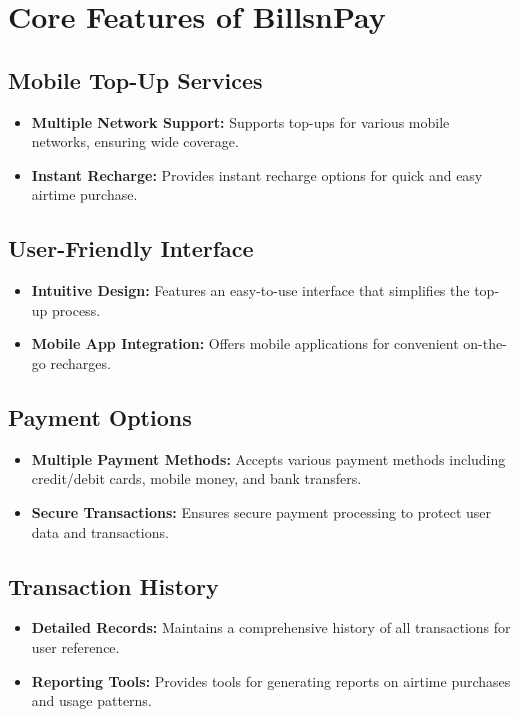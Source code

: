 \documentclass[a4paper,12pt]{report}
\begin{document}
	
	\section{Core Features of BillsnPay}
	
	\subsection{Mobile Top-Up Services}
	\begin{itemize}
		\item \textbf{Multiple Network Support:} Supports top-ups for various mobile networks, ensuring wide coverage.
		\item \textbf{Instant Recharge:} Provides instant recharge options for quick and easy airtime purchase.
	\end{itemize}
	
	\subsection{User-Friendly Interface}
	\begin{itemize}
		\item \textbf{Intuitive Design:} Features an easy-to-use interface that simplifies the top-up process.
		\item \textbf{Mobile App Integration:} Offers mobile applications for convenient on-the-go recharges.
	\end{itemize}
	
	\subsection{Payment Options}
	\begin{itemize}
		\item \textbf{Multiple Payment Methods:} Accepts various payment methods including credit/debit cards, mobile money, and bank transfers.
		\item \textbf{Secure Transactions:} Ensures secure payment processing to protect user data and transactions.
	\end{itemize}
	
	\subsection{Transaction History}
	\begin{itemize}
		\item \textbf{Detailed Records:} Maintains a comprehensive history of all transactions for user reference.
		\item \textbf{Reporting Tools:} Provides tools for generating reports on airtime purchases and usage patterns.
	\end{itemize}
	
\end{document}
